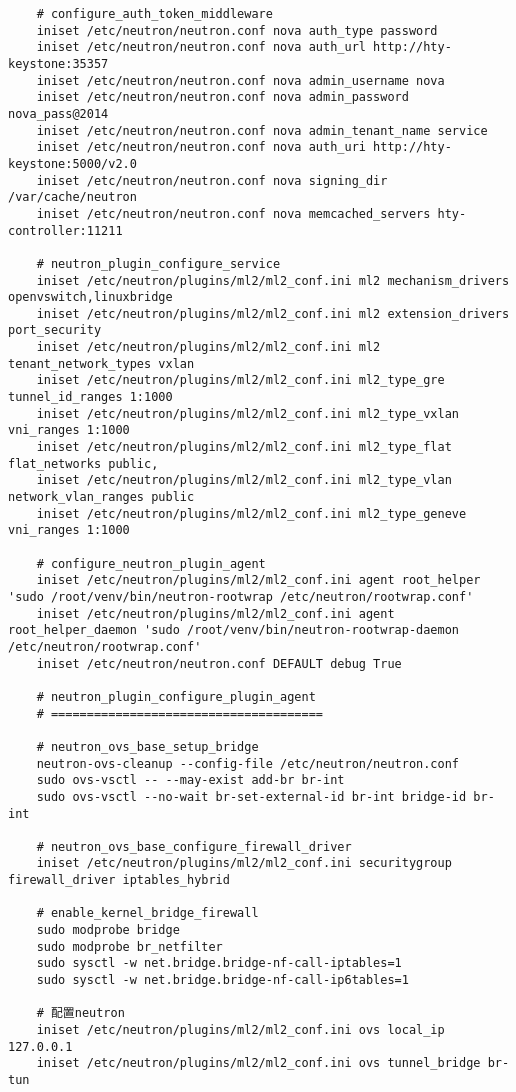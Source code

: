 \documentclass[a4paper,left=1.5cm,right=1.5cm,11pt]{article}
\begin{document}
\begin{lstlisting}
	# configure_auth_token_middleware
	iniset /etc/neutron/neutron.conf nova auth_type password
	iniset /etc/neutron/neutron.conf nova auth_url http://hty-keystone:35357
	iniset /etc/neutron/neutron.conf nova admin_username nova
	iniset /etc/neutron/neutron.conf nova admin_password nova_pass@2014
	iniset /etc/neutron/neutron.conf nova admin_tenant_name service
	iniset /etc/neutron/neutron.conf nova auth_uri http://hty-keystone:5000/v2.0
	iniset /etc/neutron/neutron.conf nova signing_dir /var/cache/neutron
	iniset /etc/neutron/neutron.conf nova memcached_servers hty-controller:11211

	# neutron_plugin_configure_service
	iniset /etc/neutron/plugins/ml2/ml2_conf.ini ml2 mechanism_drivers openvswitch,linuxbridge
	iniset /etc/neutron/plugins/ml2/ml2_conf.ini ml2 extension_drivers port_security
	iniset /etc/neutron/plugins/ml2/ml2_conf.ini ml2 tenant_network_types vxlan
	iniset /etc/neutron/plugins/ml2/ml2_conf.ini ml2_type_gre tunnel_id_ranges 1:1000
	iniset /etc/neutron/plugins/ml2/ml2_conf.ini ml2_type_vxlan vni_ranges 1:1000
	iniset /etc/neutron/plugins/ml2/ml2_conf.ini ml2_type_flat flat_networks public,
	iniset /etc/neutron/plugins/ml2/ml2_conf.ini ml2_type_vlan network_vlan_ranges public
	iniset /etc/neutron/plugins/ml2/ml2_conf.ini ml2_type_geneve vni_ranges 1:1000

	# configure_neutron_plugin_agent
	iniset /etc/neutron/plugins/ml2/ml2_conf.ini agent root_helper 'sudo /root/venv/bin/neutron-rootwrap /etc/neutron/rootwrap.conf'
	iniset /etc/neutron/plugins/ml2/ml2_conf.ini agent root_helper_daemon 'sudo /root/venv/bin/neutron-rootwrap-daemon /etc/neutron/rootwrap.conf'
	iniset /etc/neutron/neutron.conf DEFAULT debug True

	# neutron_plugin_configure_plugin_agent
	# ======================================

	# neutron_ovs_base_setup_bridge
	neutron-ovs-cleanup --config-file /etc/neutron/neutron.conf
	sudo ovs-vsctl -- --may-exist add-br br-int
	sudo ovs-vsctl --no-wait br-set-external-id br-int bridge-id br-int
	
	# neutron_ovs_base_configure_firewall_driver
	iniset /etc/neutron/plugins/ml2/ml2_conf.ini securitygroup firewall_driver iptables_hybrid
	
	# enable_kernel_bridge_firewall
	sudo modprobe bridge
	sudo modprobe br_netfilter
	sudo sysctl -w net.bridge.bridge-nf-call-iptables=1
	sudo sysctl -w net.bridge.bridge-nf-call-ip6tables=1

	# 配置neutron
	iniset /etc/neutron/plugins/ml2/ml2_conf.ini ovs local_ip 127.0.0.1
	iniset /etc/neutron/plugins/ml2/ml2_conf.ini ovs tunnel_bridge br-tun


\end{lstlisting}
\end{document}

